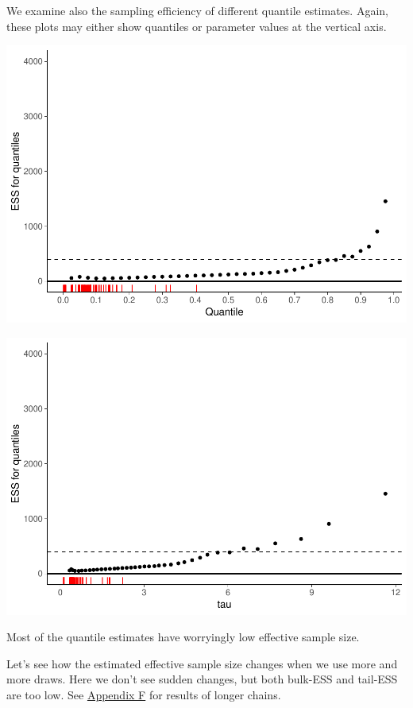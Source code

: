 \documentclass[american,]{article}
\begin{document}
We examine also the sampling efficiency of different quantile estimates.
Again, these plots may either show quantiles or parameter values at the
vertical axis.

\includegraphics{graphics/quantile-ess-fit-cp-1.pdf}

\includegraphics{graphics/quantile-ess-fit-cp-norank-1.pdf}

Most of the quantile estimates have worryingly low effective sample
size.

Let's see how the estimated effective sample size changes when we use
more and more draws. Here we don't see sudden changes, but both bulk-ESS
and tail-ESS are too low. See \protect\hyperlink{AppendixF}{Appendix F}
for results of longer chains.
\end{document}
